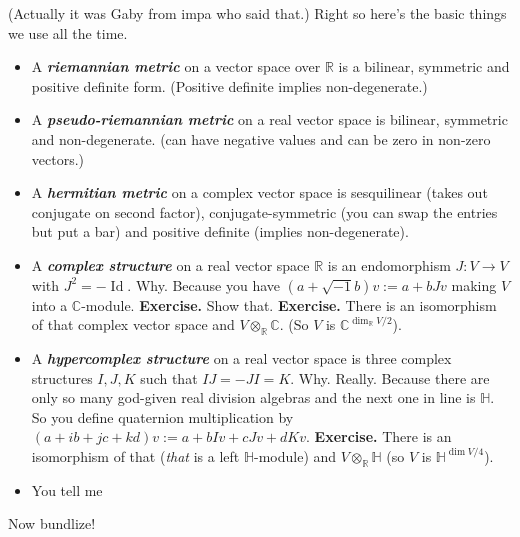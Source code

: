 (Actually it was Gaby from impa who said that.) Right so here's the basic things we use all the time.
\begin{itemize}
\item A \textit{\textbf{riemannian metric}} on a vector space over \(\mathbb{R}\) is a bilinear, symmetric and positive definite form. (Positive definite implies non-degenerate.)
\item A \textit{\textbf{pseudo-riemannian metric}} on a real vector space is bilinear, symmetric and non-degenerate. (can have negative values and can be zero in non-zero vectors.)
\item A \textit{\textbf{hermitian metric}} on a complex vector space is sesquilinear (takes out conjugate on second factor), conjugate-symmetric (you can swap the entries but put a bar) and positive definite (implies non-degenerate).
\item A \textit{\textbf{complex structure}} on a real vector space  \(\mathbb{R}\) is an endomorphism \(J:V \to V\) with \(J^2=-\operatorname{Id}\). Why. Because you have \((a+\sqrt{-1}b)v:=a+bJv\) making \(V\) into a \(\mathbb{C}\)-module. \textbf{Exercise.} Show that.  \textbf{Exercise.} There is an isomorphism of that complex vector space and \(V \otimes_{\mathbb{R}}\mathbb{C}\). (So \(V\) is \(\mathbb{C}^{\dim_{\mathbb{R}} V/2}\)).
\item A \textit{\textbf{hypercomplex structure}} on a real vector space is three complex structures \(I,J,K\) such that \(I J =- J I = K\). Why. Really. Because there are only so many god-given real division algebras and the next one in line is \(\mathbb{H}\). So you define quaternion multiplication by \((a+ib+jc+kd)v:=a+b Iv+c Jv + d Kv\). \textbf{Exercise.} There is an isomorphism of that (\textit{that} is a left \(\mathbb{H}\)-module) and \(V \otimes_{\mathbb{R}}\mathbb{H}\) (so \(V\) is \(\mathbb{H}^{\dim V/4}\)).
\item You tell me
\end{itemize}
Now bundlize!
